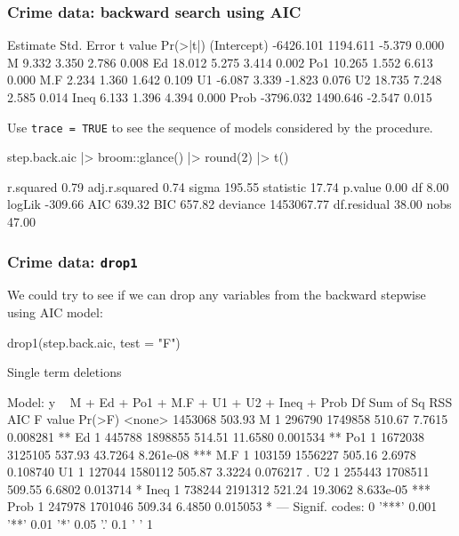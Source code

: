 \documentclass[a4paper]{article}\usepackage[]{graphicx}\usepackage[]{xcolor}
\begin{document}
\subsubsection{Crime data: backward search using AIC}
\begin{Schunk}
\begin{Soutput}
             Estimate Std. Error t value Pr(>|t|)
(Intercept) -6426.101   1194.611  -5.379    0.000
M               9.332      3.350   2.786    0.008
Ed             18.012      5.275   3.414    0.002
Po1            10.265      1.552   6.613    0.000
M.F             2.234      1.360   1.642    0.109
U1             -6.087      3.339  -1.823    0.076
U2             18.735      7.248   2.585    0.014
Ineq            6.133      1.396   4.394    0.000
Prob        -3796.032   1490.646  -2.547    0.015
\end{Soutput}
\end{Schunk}
Use \lstinline|trace = TRUE| to see the sequence of models considered by the procedure.
\begin{Schunk}
\begin{Sinput}
step.back.aic |>
  broom::glance() |> 
  round(2) |> t()
\end{Sinput}
\begin{Soutput}
                    [,1]
r.squared           0.79
adj.r.squared       0.74
sigma             195.55
statistic          17.74
p.value             0.00
df                  8.00
logLik           -309.66
AIC               639.32
BIC               657.82
deviance      1453067.77
df.residual        38.00
nobs               47.00
\end{Soutput}
\end{Schunk}
\subsubsection{Crime data: \lstinline|drop1|}
We could try to see if we can drop any variables from the backward stepwise using AIC model:
\begin{Schunk}
\begin{Sinput}
drop1(step.back.aic, test = "F")
\end{Sinput}
\begin{Soutput}
Single term deletions

Model:
y ~ M + Ed + Po1 + M.F + U1 + U2 + Ineq + Prob
       Df Sum of Sq     RSS    AIC F value    Pr(>F)    
<none>              1453068 503.93                      
M       1    296790 1749858 510.67  7.7615  0.008281 ** 
Ed      1    445788 1898855 514.51 11.6580  0.001534 ** 
Po1     1   1672038 3125105 537.93 43.7264 8.261e-08 ***
M.F     1    103159 1556227 505.16  2.6978  0.108740    
U1      1    127044 1580112 505.87  3.3224  0.076217 .  
U2      1    255443 1708511 509.55  6.6802  0.013714 *  
Ineq    1    738244 2191312 521.24 19.3062 8.633e-05 ***
Prob    1    247978 1701046 509.34  6.4850  0.015053 *  
---
Signif. codes:  0 '***' 0.001 '**' 0.01 '*' 0.05 '.' 0.1 ' ' 1
\end{Soutput}
\end{Schunk}
\end{document}
